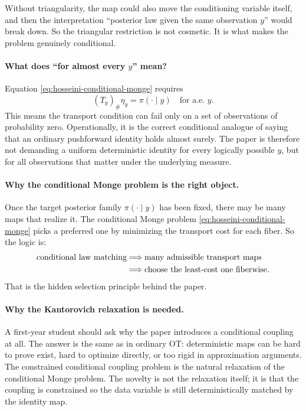 \documentclass[11pt]{report}
\newcommand{\pushf}[2]{\left(#1\right)_{\#} #2}
\begin{document}
Without triangularity, the map could also move the conditioning variable itself,
and then the interpretation ``posterior law given the same observation $y$'' would
break down.  So the triangular restriction is not cosmetic.  It is what makes the
problem genuinely conditional.

\paragraph{What does ``for almost every $y$'' mean?}
Equation \eqref{eq:hosseini-conditional-monge} requires
\begin{equation}
\pushf{T_y}{\eta_y} = \pi(\cdot\mid y)
\quad\text{for a.e. }y.
\label{eq:hosseini-ae-condition}
\end{equation}
This means the transport condition can fail only on a set of observations of
probability zero.  Operationally, it is the correct conditional analogue of saying
that an ordinary pushforward identity holds almost surely.  The paper is therefore
not demanding a uniform deterministic identity for every logically possible $y$,
but for all observations that matter under the underlying measure.

\paragraph{Why the conditional Monge problem is the right object.}
Once the target posterior family $\pi(\cdot\mid y)$ has been fixed, there may be
many maps that realize it.  The conditional Monge problem
\eqref{eq:hosseini-conditional-monge} picks a preferred one by minimizing the
transport cost for each fiber.  So the logic is:
\begin{align}
\text{conditional law matching}
&\Longrightarrow
\text{many admissible transport maps}
\notag\\
&\Longrightarrow
\text{choose the least-cost one fiberwise}.
\label{eq:hosseini-selection-logic}
\end{align}
That is the hidden selection principle behind the paper.

\paragraph{Why the Kantorovich relaxation is needed.}
A first-year student should ask why the paper introduces a conditional coupling at
all.  The answer is the same as in ordinary OT: deterministic maps can be hard to
prove exist, hard to optimize directly, or too rigid in approximation arguments.
The constrained conditional coupling problem is the natural relaxation of the
conditional Monge problem.  The novelty is not the relaxation itself; it is that
the coupling is constrained so the data variable is still deterministically matched
by the identity map.
\end{document}
